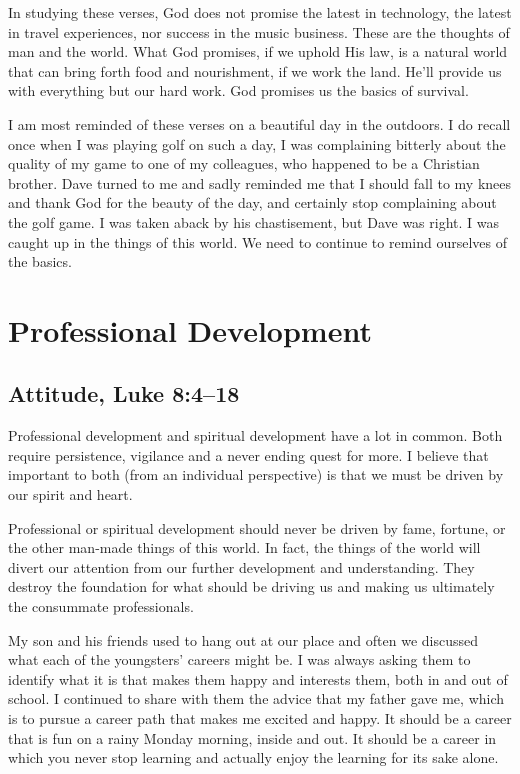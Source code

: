\documentclass[12pt]{memoir}
\begin{document}
In studying these verses, God does not promise the latest in technology,
the latest in travel experiences, nor success in the music business.
These are the thoughts of man and the world. What God promises, if
we uphold His law, is a natural world that can bring forth food and
nourishment, if we work the land. He'll provide us with everything
but our hard work. God promises us the basics of survival. 

I am most reminded of these verses on a beautiful day in the outdoors.
I do recall once when I was playing golf on such a day, I was complaining
bitterly about the quality of my game to one of my colleagues, who
happened to be a Christian brother. Dave turned to me and sadly reminded
me that I should fall to my knees and thank God for the beauty of
the day, and certainly stop complaining about the golf game. I was
taken aback by his chastisement, but Dave was right. I was caught
up in the things of this world. We need to continue to remind ourselves
of the basics.

\section{Professional Development}

\subsection[Attitude]{Attitude, Luke 8:4--18}


Professional development and spiritual development have a lot in common.
Both require persistence, vigilance and a never ending quest for more.
I believe that important to both (from an individual perspective) is that we must be driven by our spirit and heart. 

Professional or spiritual development should never be driven by fame,
fortune, or the other man-made things of this world. In fact,
the things of the world will divert our attention from our further
development and understanding. They destroy the foundation for what
should be driving us and making us ultimately the consummate professionals.

My son and his friends used to hang out at our place and often we discussed what each of the youngsters' careers might be. I was always asking them to identify what it is that makes them happy and interests them, both in and out of school. I continued to share with them the advice
that my father gave me, which is to pursue a career path that makes
me excited and happy. It should be a career that is fun on a rainy
Monday morning, inside and out. It should be a career in which you never stop learning and actually enjoy the learning for its sake alone. 
\end{document}
